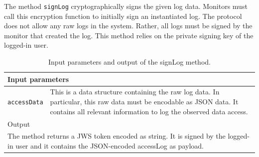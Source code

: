 \documentclass[../main.tex]{subfiles}
\begin{document}
The method \verb|signLog| cryptographically signs the given log data.
Monitors must call this encryption function to initially sign an instantiated log.
The protocol does not allow any raw logs in the system.
Rather, all logs must be signed by the monitor that created the log. 
This method relies on the private signing key of the logged-in user.
\begin{table}[ht]
    \centering
    \begin{tabular}{|p{3cm}p{10cm}|}
        \hline
        \multicolumn{2}{|l|}{Input parameters}    \\ \hline
        \verb|accessData|              & This is a data structure containing the raw log data. In particular, this raw data must be encodable as JSON data. It contains all relevant information to log the observed data access.           \\ \hline
        \multicolumn{2}{|l|}{Output}   \\ \hline
        \multicolumn{2}{|p{13cm}|}{The method returns a JWS token encoded as string. It is signed by the logged-in user and it contains the JSON-encoded accessLog as payload.} \\ \hline
    \end{tabular} 
    \caption[Signature of signLog]{Input parameters and output of the signLog method.}
\end{table}
\end{document}

